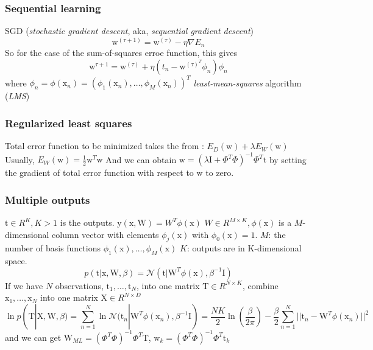 \documentclass[a4paper]{book}
\begin{document}
\subsubsection{Sequential learning}
SGD (\textit{stochastic gradient descent}, aka, \textit{sequential gradient descent})\newline
$$\mathrm w^{(\tau+1)}=\mathrm w^{(\tau)}-\eta\nabla E_n$$
So for the case of the sum-of-squares erroe function, this gives
$$\mathrm w^{\tau+1}=\mathrm w^{(\tau)}+\eta(t_n-\mathrm w^{(\tau)^T}\phi_n)\phi_n$$ where $\phi_n=\phi(\mathrm x_n)=(\phi_1(\mathrm x_n), \dots, \phi_M(\mathrm x_n))^T$
\textit{least-mean-squares} algorithm (\textit{LMS})
\subsubsection{Regularized least squares}
Total error function to be minimized takes the from :
$E_D(\mathrm w) +\lambda E_W(\mathrm w)$ Usually, $E_W(\mathrm w) = \frac12\mathrm w^T\mathrm w$ And we can obtain $\mathrm w=(\lambda\mathrm I+\Phi^T\Phi)^{-1}\Phi^T\mathrm t$ by setting the gradient of total error function with respect to $\mathrm w$ to zero.
\subsubsection{Multiple outputs}
$\mathrm t\in R^K, K>1$ is the outputs.\newline
$\mathrm y(\mathrm x,\mathrm W) =W^T\phi(\mathrm x)$
$W\in R^{M\times K }, \phi(\mathrm x)$ is a $M$-dimensional column vector with elements $\phi_j(\mathrm x)$ with $\phi_0(\mathrm x) = 1$.\newline
$M$: the number of basis functions $\phi_1(\mathrm x), \dots, \phi_M(\mathrm x)$\newline
$K$: outputs are in K-dimensional space.
$$p(\mathrm t|\mathrm x,\mathrm W,\beta) = \mathcal N(\mathrm t|\mathrm W^T\phi(\mathrm x),\beta^{-1}\mathrm I)$$
If we have $N$ observations, $\mathrm t_1,\dots,\mathrm t_N$, into one matrix $\mathrm T\in R^{N\times K}$, combine $\mathrm x_1,\dots,\mathrm x_N$  into one  matrix $\mathrm X\in R^{N\times D}$
\begin{equation}\label{eq2.2.3}
  \ln p(\mathrm T|\mathrm X,\mathrm W,\beta) = \sum_{n=1}^N\ln\mathcal N(\mathrm t_n|\mathrm W^T\phi(\mathrm x_n), \beta^{-1}\mathrm I) = \frac{NK}{2}\ln(\frac{\beta}{2\pi})-\frac{\beta}{2}\sum_{n=1}^N||\mathrm t_n-\mathrm W^T\phi(\mathrm x_n)||^2
\end{equation}
and we can get $\mathrm W_{ML} = (\Phi^T\Phi)^{-1}\Phi^T\mathrm T$, $\mathrm w_k = (\Phi^T\Phi)^{-1}\Phi^T\mathrm t_k$
\end{document}
